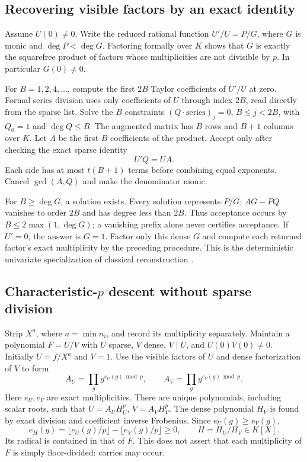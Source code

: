 \documentclass[11pt]{article}
\begin{document}
\subsection{Recovering visible factors by an exact identity}
Assume $U(0)\ne0$. Write the reduced rational function $U'/U=P/G$,
where $G$ is monic and $\deg P<\deg G$. Factoring formally over $K$
shows that $G$ is exactly the squarefree product of factors whose
multiplicities are not divisible by $p$. In particular $G(0)\ne0$.

For $B=1,2,4,\ldots$, compute the first $2B$ Taylor coefficients of
$U'/U$ at zero. Formal series division uses only coefficients of $U$
through index $2B$, read directly from the sparse list. Solve the $B$
constraints $(Q\cdot\text{series})_j=0$, $B\le j<2B$, with $Q_0=1$
and $\deg Q\le B$. The augmented matrix has $B$ rows and $B+1$
columns over $K$. Let $A$ be the first $B$ coefficients of the product.
Accept only after checking the exact sparse identity
\begin{equation}\label{eq:padecertificate} U'Q=UA.\end{equation}
Each side has at most $t(B+1)$ terms before combining equal exponents.
Cancel $\gcd(A,Q)$ and make the denominator monic.

For $B\ge\deg G$, a solution exists. Every solution represents $P/G$:
$AG-PQ$ vanishes to order $2B$ and has degree less than $2B$.
Thus acceptance occurs by $B\le2\max(1,\deg G)$; a vanishing prefix
alone never certifies acceptance. If $U'=0$, the answer is $G=1$.
Factor only this dense $G$ and compute each returned factor's exact
multiplicity by the preceding procedure. This is the deterministic
univariate specialization of classical reconstruction \cite{Kaltofen88}.

\subsection{Characteristic-$p$ descent without sparse division}
Strip $X^a$, where $a=\min n_i$, and record its multiplicity separately.
Maintain a polynomial $F=U/V$ with $U$ sparse, $V$ dense, $V\mid U$,
and $U(0)V(0)\ne0$. Initially $U=f/X^a$ and $V=1$.
Use the visible factors of $U$ and dense factorization of $V$ to form
\[
 A_U=\prod_g g^{e_U(g)\bmod p},\qquad
 A_V=\prod_g g^{e_V(g)\bmod p}.
\]
Here $e_U,e_V$ are exact multiplicities. There are unique polynomials,
including scalar roots, such that $U=A_UH_U^p$, $V=A_VH_V^p$.
The dense polynomial $H_V$ is found by exact division and coefficient
inverse Frobenius. Since $e_U(g)\ge e_V(g)$,
\[
 e_H(g)=\lfloor e_U(g)/p\rfloor-\lfloor e_V(g)/p\rfloor\ge0,
 \qquad H=H_U/H_V\in K[X].
\]
Its radical is contained in that of $F$. This does not assert that each
multiplicity of $F$ is simply floor-divided: carries may occur.
\end{document}

